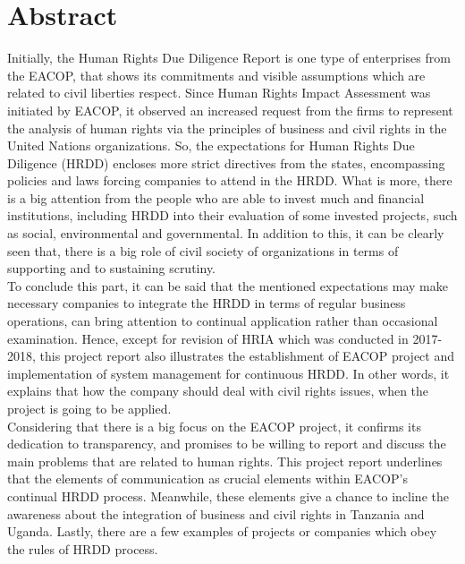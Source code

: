 \documentclass[12pt]{article}
\begin{document}
\section*{Abstract}
{\fontsize{12pt}{12pt}\selectfont



\hspace*{1em} Initially, the Human Rights Due Diligence Report is one type of enterprises from the EACOP, that shows its commitments and visible assumptions which are related to civil liberties respect. Since Human Rights Impact Assessment was initiated by EACOP, it observed an increased request from the firms to represent the analysis of human rights via the principles of business and civil rights in the United Nations organizations. So, the expectations for Human Rights Due Diligence (HRDD) encloses more strict directives from the states, encompassing policies and laws forcing companies to attend in the HRDD. What is more, there is a big attention from the people who are able to invest much and financial institutions, including HRDD into their evaluation of some invested projects, such as social, environmental and governmental. In addition to this, it can be clearly seen that, there is a big role of civil society of organizations in terms of supporting and to sustaining scrutiny. 
\\

To conclude this part, it can be said that the mentioned expectations may make necessary companies to integrate the HRDD in terms of regular business operations, can bring attention to continual application rather than occasional examination. Hence, except for revision of HRIA which was conducted in 2017-2018, this project report also illustrates the establishment of EACOP project and implementation of system management for continuous HRDD. In other words, it explains that how the company should deal with civil rights issues, when the project is going to be applied.  
\\

Considering that there is a big focus on the EACOP project, it confirms its dedication to transparency, and promises to be willing to report and discuss the main problems that are related to human rights. This project report underlines that the elements of communication as crucial elements within EACOP’s continual HRDD process. Meanwhile, these elements give a chance to incline the awareness about the integration of business and civil rights in Tanzania and Uganda. Lastly, there are a few examples of projects or companies which obey the rules of HRDD process.
\\
\\

}
\end{document}
